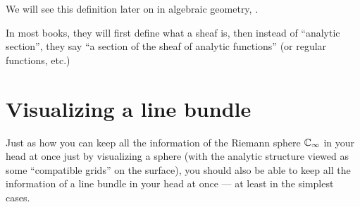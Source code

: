 We will see this definition later on in algebraic geometry, .

\begin{remark}
	In most books, they will first define what a sheaf is, then instead of ``analytic section'',
	they say ``a section of the sheaf of analytic functions'' (or regular functions, etc.)
\end{remark}

\section{Visualizing a line bundle}

Just as how you can keep all the information of the Riemann sphere $\mathbb C_\infty$ in your head at
once just by visualizing a sphere (with the analytic structure viewed as some ``compatible grids''
on the surface), you should also be able to keep all the information of a line bundle in your head
at once --- at least in the simplest cases.

